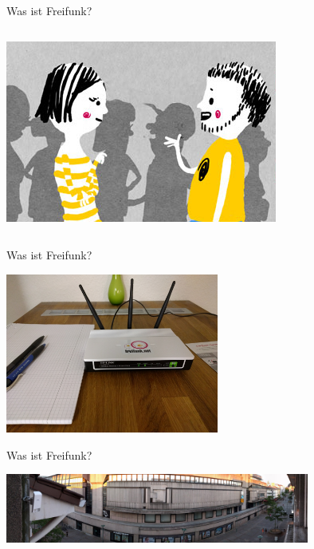 \documentclass[t]{beamer}
\begin{document}
\begin{frame}{Was ist Freifunk?}
\begin{columns}
\begin{column}{0.25\textwidth}
\begin{center}
          \includegraphics[width=\textwidth]{images/talk}
        \end{center}
      \end{column}
    \end{columns}
  \end{frame}

  \begin{frame}{Was ist Freifunk?}
    \begin{center}
      \includegraphics[width=7cm]{images/homerouter}
    \end{center}
  \end{frame}

  \begin{frame}{Was ist Freifunk?}
    \begin{center}
      \includegraphics[width=10cm]{images/irl/wilhelminenstr1}
    \end{center}
  \end{frame}
\end{document}
